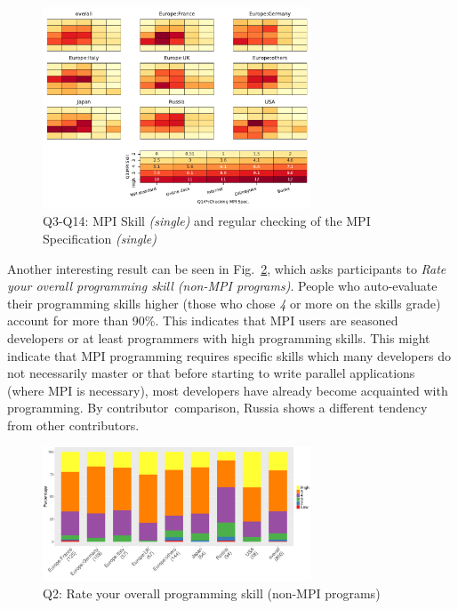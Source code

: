 \documentclass[preprint,5p,times]{elsarticle}
\def\myquote#1{{\it #1}}
\def\country{contributor\xspace{}}%
\def\countries{contributors\xspace{}}%
\begin{document}
\begin{figure}[tb]
\begin{center}
\includegraphics[width=8.0cm]{Figs/Q3-Q14.pdf}
\vspace{-1.5mm}
\caption{Q3-Q14: MPI Skill {\it(single)} and regular checking of the MPI Specification {\it(single)}}
\label{fig:reading-standard-and-checking-spec}
\vspace{-3mm}%
\end{center}
\end{figure}

Another interesting result can be seen in Fig.~\ref{fig:prog-skill}, which asks participants to
\myquote{Rate your overall programming skill (non-MPI programs)}. People who
auto-evaluate their programming skills higher (those who chose \myquote{4} or
more on the skills grade) account for more than 90\%. This indicates that MPI
users are seasoned developers or at least programmers with high programming
skills. This might indicate that MPI programming requires specific skills which
many developers do not necessarily master or that before starting to write
parallel applications (where MPI is necessary), most developers have already
become acquainted with programming. By \country\ comparison, Russia shows a
different tendency from other \countries.

\begin{figure}[tb]
\begin{center}
\includegraphics[width=8.0cm]{R-scripts/Q2.pdf}
\vspace{-1.5mm}
\caption{Q2: Rate your overall programming skill (non-MPI
  programs)}
\label{fig:prog-skill}
\vspace{-3mm}%
\end{center}
\end{figure}
\end{document}
